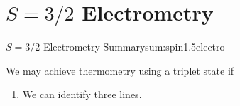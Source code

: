 \section{$S=3/2$ Electrometry}



\begin{summary}{$S=3/2$ Electrometry Summary}{sum:spin1.5electro}

	We may achieve thermometry using a triplet state if
	\begin{enumerate}
		\item We can identify three lines.
	\end{enumerate}

\end{summary}

